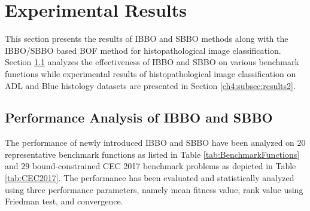 \section{Experimental Results}\label{sec:exp}

This section presents the results of IBBO and SBBO methods along with the IBBO/SBBO  based BOF method for histopathological image classification. Section \ref{ch4:subsec:results1} analyzes the effectiveness of IBBO and SBBO on various benchmark functions while experimental results of histopathological image classification on ADL and Blue histology datasets are presented in Section \ref{ch4:subsec:results2}.



\subsection{Performance Analysis of IBBO and SBBO}\label{ch4:subsec:results1}
The performance of newly introduced IBBO and SBBO  have been analyzed on $20$ representative benchmark functions as listed in Table \ref{tab:BenchmarkFunctions} \cite{yang2014} \cite{Simon2013} \cite{jamil2013}  and $29$ bound-constrained CEC 2017 benchmark problems  \cite{wu2016} as depicted in Table \ref{tab:CEC2017}. The performance has been evaluated and statistically analyzed using three performance parameters, namely mean fitness value, rank value using Friedman test, and convergence. 


